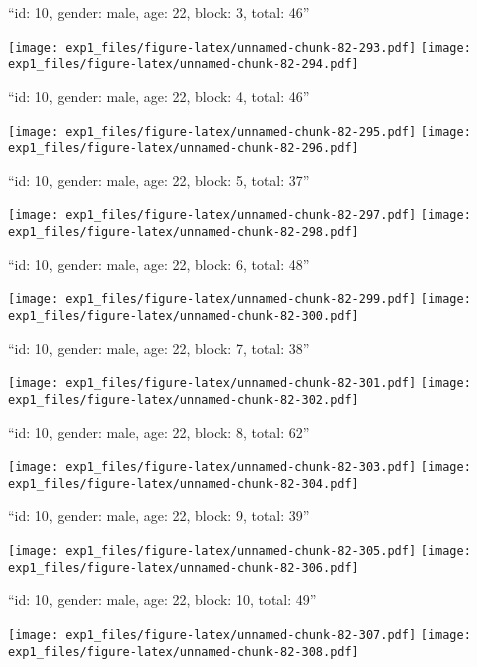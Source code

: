 \documentclass[11pt,,]{article}
\begin{document}
\newpage
[1] 

``id: 10, gender: male, age: 22, block: 3, total: 46''

\texttt{[image: exp1\_files/figure-latex/unnamed-chunk-82-293.pdf]}
\texttt{[image: exp1\_files/figure-latex/unnamed-chunk-82-294.pdf]}

\newpage
[1] 

``id: 10, gender: male, age: 22, block: 4, total: 46''

\texttt{[image: exp1\_files/figure-latex/unnamed-chunk-82-295.pdf]}
\texttt{[image: exp1\_files/figure-latex/unnamed-chunk-82-296.pdf]}

\newpage
[1] 

``id: 10, gender: male, age: 22, block: 5, total: 37''

\texttt{[image: exp1\_files/figure-latex/unnamed-chunk-82-297.pdf]}
\texttt{[image: exp1\_files/figure-latex/unnamed-chunk-82-298.pdf]}

\newpage
[1] 

``id: 10, gender: male, age: 22, block: 6, total: 48''

\texttt{[image: exp1\_files/figure-latex/unnamed-chunk-82-299.pdf]}
\texttt{[image: exp1\_files/figure-latex/unnamed-chunk-82-300.pdf]}

\newpage
[1] 

``id: 10, gender: male, age: 22, block: 7, total: 38''

\texttt{[image: exp1\_files/figure-latex/unnamed-chunk-82-301.pdf]}
\texttt{[image: exp1\_files/figure-latex/unnamed-chunk-82-302.pdf]}

\newpage
[1] 

``id: 10, gender: male, age: 22, block: 8, total: 62''

\texttt{[image: exp1\_files/figure-latex/unnamed-chunk-82-303.pdf]}
\texttt{[image: exp1\_files/figure-latex/unnamed-chunk-82-304.pdf]}

\newpage
[1] 

``id: 10, gender: male, age: 22, block: 9, total: 39''

\texttt{[image: exp1\_files/figure-latex/unnamed-chunk-82-305.pdf]}
\texttt{[image: exp1\_files/figure-latex/unnamed-chunk-82-306.pdf]}

\newpage
[1] 

``id: 10, gender: male, age: 22, block: 10, total: 49''

\texttt{[image: exp1\_files/figure-latex/unnamed-chunk-82-307.pdf]}
\texttt{[image: exp1\_files/figure-latex/unnamed-chunk-82-308.pdf]}
\end{document}
